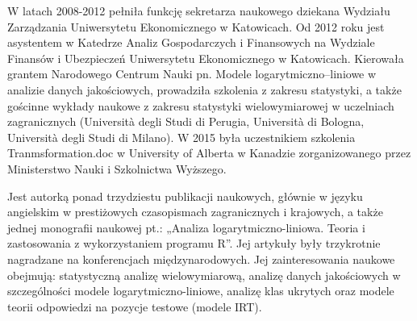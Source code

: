 \documentclass[\main/boa.tex]{subfiles}
\begin{document}
W latach 2008-2012 pełniła funkcję sekretarza naukowego dziekana Wydziału Zarządzania Uniwersytetu Ekonomicznego w Katowicach. Od 2012 roku jest asystentem w Katedrze Analiz Gospodarczych i Finansowych na Wydziale Finansów i Ubezpieczeń Uniwersytetu Ekonomicznego w Katowicach. Kierowała grantem Narodowego Centrum Nauki pn. Modele logarytmiczno–liniowe w analizie danych jakościowych, prowadziła szkolenia z zakresu statystyki, a także gościnne wykłady naukowe z zakresu statystyki wielowymiarowej w uczelniach zagranicznych (Università degli Studi di Perugia, Università di Bologna, Università degli Studi di Milano). W 2015 była uczestnikiem szkolenia Tranmsformation.doc w University of Alberta w Kanadzie zorganizowanego przez Ministerstwo Nauki i Szkolnictwa Wyższego.

Jest autorką ponad trzydziestu publikacji naukowych, głównie w języku angielskim w prestiżowych czasopismach zagranicznych i krajowych, a także jednej monografii naukowej pt.: „Analiza logarytmiczno-liniowa. Teoria i zastosowania z wykorzystaniem programu R”. Jej artykuły były trzykrotnie nagradzane na konferencjach międzynarodowych. Jej zainteresowania naukowe obejmują: statystyczną analizę wielowymiarową, analizę danych jakościowych w szczególności modele logarytmiczno-liniowe, analizę klas ukrytych oraz modele teorii odpowiedzi na pozycje testowe (modele IRT).
\end{document}
